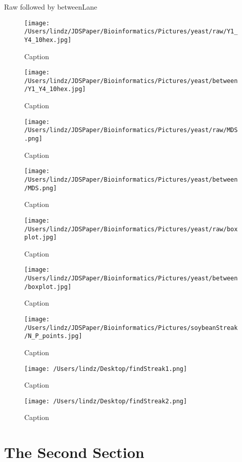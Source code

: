 \documentclass[preprint,12pt]{elsarticle}
\begin{document}
Raw followed by betweenLane

\begin{figure}[h]
\centering\texttt{[image: /Users/lindz/JDSPaper/Bioinformatics/Pictures/yeast/raw/Y1\_Y4\_10hex.jpg]}
\caption{Caption}
\end{figure}

\begin{figure}[h]
\centering\texttt{[image: /Users/lindz/JDSPaper/Bioinformatics/Pictures/yeast/between/Y1\_Y4\_10hex.jpg]}
\caption{Caption}
\end{figure}

\begin{figure}[h]
\centering\texttt{[image: /Users/lindz/JDSPaper/Bioinformatics/Pictures/yeast/raw/MDS.png]}
\caption{Caption}
\end{figure}

\begin{figure}[h]
\centering\texttt{[image: /Users/lindz/JDSPaper/Bioinformatics/Pictures/yeast/between/MDS.png]}
\caption{Caption}
\end{figure}

\begin{figure}[h]
\centering\texttt{[image: /Users/lindz/JDSPaper/Bioinformatics/Pictures/yeast/raw/boxplot.jpg]}
\caption{Caption}
\end{figure}

\begin{figure}[h]
\centering\texttt{[image: /Users/lindz/JDSPaper/Bioinformatics/Pictures/yeast/between/boxplot.jpg]}
\caption{Caption}
\end{figure}

\begin{figure}[h]
\centering\texttt{[image: /Users/lindz/JDSPaper/Bioinformatics/Pictures/soybeanStreak/N\_P\_points.jpg]}
\caption{Caption}
\end{figure}

\begin{figure}[h]
\centering\texttt{[image: /Users/lindz/Desktop/findStreak1.png]}
\caption{Caption}
\end{figure}

\begin{figure}[h]
\centering\texttt{[image: /Users/lindz/Desktop/findStreak2.png]}
\caption{Caption}
\end{figure}


\section{The Second Section}
\label{S:2}
\end{document}
